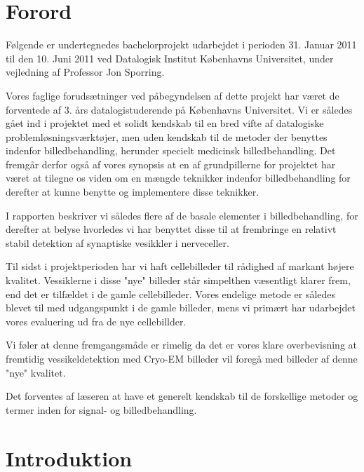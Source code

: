\thispagestyle{plain}
\section{Forord}
Følgende er undertegnedes bachelorprojekt udarbejdet i perioden 31. Januar 2011 til den 10. Juni 2011 ved Datalogisk Institut Københavns Universitet, under vejledning af Professor Jon Sporring.

Vores faglige forudsætninger ved påbegyndelsen af dette projekt har været de forventede af 3. års datalogistuderende på Københavns Universitet. 
Vi er således gået ind i projektet med et solidt kendskab til en bred vifte af datalogiske problemløsningsværktøjer, men uden kendskab til de metoder der benyttes indenfor billedbehandling, herunder specielt medicinsk billedbehandling.
Det fremgår derfor også af vores synopsis at en af grundpillerne for projektet har været at tilegne os viden om en mængde teknikker indenfor billedbehandling for derefter at kunne benytte og implementere disse teknikker.

I rapporten beskriver vi således flere af de basale elementer i billedbehandling, for derefter at belyse hvorledes vi har benyttet disse til at frembringe en relativt stabil detektion af synaptiske vesikkler i nerveceller.


Til sidst i projektperioden har vi haft cellebilleder til rådighed af markant højere kvalitet. Vessiklerne i disse "nye" billeder står simpelthen væsentligt klarer frem, end det er tilfældet i de gamle cellebilleder.
Vores endelige metode er således blevet til med udgangspunkt i de gamle billeder, mens vi primært har udarbejdet vores evaluering ud fra de nye cellebillder.

Vi føler at denne fremgangsmåde er rimelig da det er vores klare overbevisning at fremtidig vessikeldetektion med Cryo-EM billeder vil foregå med billeder af denne "nye" kvalitet.

Det forventes af læseren at have et generelt kendskab til de forskellige metoder og termer inden for signal- og billedbehandling.

\section{Introduktion}
